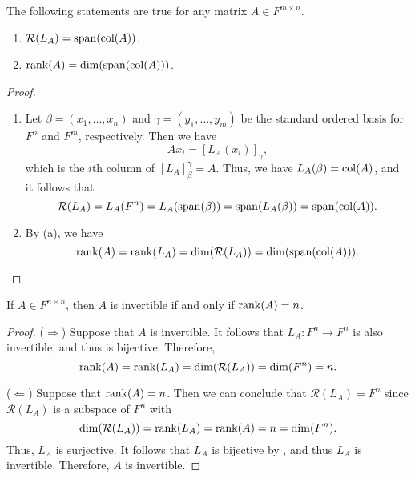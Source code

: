 \begin{proposition}
  \label{thm:column-space}
  The following statements are true for any matrix $A \in F^{m \times n}$.
  \begin{enumerate}
    \item $\mathcal{R}(L_A) = \operatorname{span}(\operatorname{col}(A))$.
    \item $\operatorname{rank}(A) = \dim(\operatorname{span}(\operatorname{col}(A)))$.
  \end{enumerate}
\end{proposition}
\begin{proof}
  \leavevmode
  \begin{enumerate}
    \item Let $\beta = (x_1, \dots, x_n)$ and $\gamma = (y_1, \dots, y_m)$ be
    the standard ordered basis for $F^n$ and $F^m$, respectively.
    Then we have
    \begin{equation*}
      Ax_i = [L_A(x_i)]_\gamma,
    \end{equation*}
    which is the $i$th column of $[L_A]_\beta^\gamma = A$.
    Thus, we have $L_A(\beta) = \operatorname{col}(A)$, and it follows that
    \begin{equation*}
      \mathcal{R}(L_A)
      = L_A(F^n)
      = L_A(\operatorname{span}(\beta))
      = \operatorname{span}(L_A(\beta))
      = \operatorname{span}(\operatorname{col}(A)).
    \end{equation*}

    \item By (a), we have
    \begin{equation*}
      \operatorname{rank}(A)
      = \operatorname{rank}(L_A)
      = \dim(\mathcal{R}(L_A))
      = \dim(\operatorname{span}(\operatorname{col}(A))).
      \qedhere
    \end{equation*}
  \end{enumerate}
\end{proof}

\begin{theorem}
  \label{thm:full-rank}
  If $A \in F^{n \times n}$, then $A$ is invertible if and only if
  $\operatorname{rank}(A) = n$.
\end{theorem}
\begin{proof}
  ($\Rightarrow$)
  Suppose that $A$ is invertible.
  It follows that $L_A: F^n \to F^n$ is also invertible, and thus is
  bijective.
  Therefore,
  \begin{equation*}
    \operatorname{rank}(A) = \operatorname{rank}(L_A) = \dim(\mathcal{R}(L_A)) = \dim(F^n) = n.
  \end{equation*}
  
  ($\Leftarrow$)
  Suppose that $\operatorname{rank}(A) = n$.
  Then we can conclude that $\mathcal{R}(L_A) = F^n$ since $\mathcal{R}(L_A)$
  is a subspace of $F^n$ with
  \begin{equation*}
    \dim(\mathcal{R}(L_A)) = \operatorname{rank}(L_A) = \operatorname{rank}(A) = n = \dim(F^n).
  \end{equation*}
  Thus, $L_A$ is surjective.
  It follows that $L_A$ is bijective by , and thus
  $L_A$ is invertible.
  Therefore, $A$ is invertible.
\end{proof}

